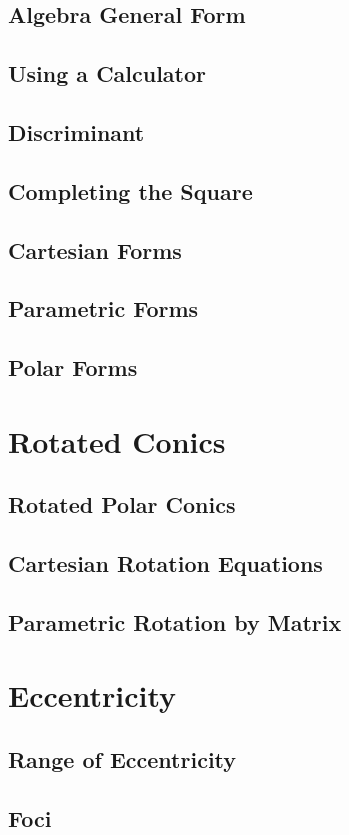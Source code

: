 \subsection{Algebra General Form}
\subsection{Using a Calculator}
\subsection{Discriminant}
\subsection{Completing the Square}
\subsection{Cartesian Forms}
\subsection{Parametric Forms}
\subsection{Polar Forms}

\newpage
\section{Rotated Conics}
\subsection{Rotated Polar Conics}
\subsection{Cartesian Rotation Equations}
\subsection{Parametric Rotation by Matrix}

\newpage
\section{Eccentricity}
\subsection{Range of Eccentricity}
\subsection{Foci}
